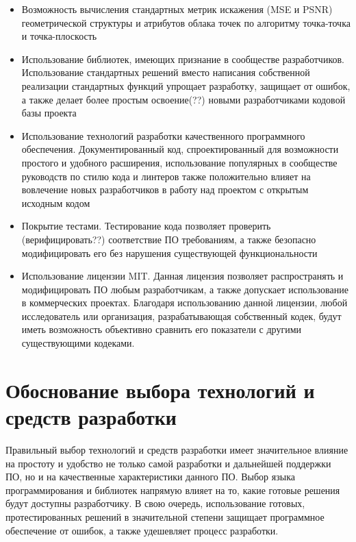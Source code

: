 \begin{itemize}
    \item Возможность вычисления стандартных метрик искажения (MSE и PSNR)
    геометрической структуры и атрибутов облака точек по алгоритму точка-точка и
    точка-плоскость
    \item Использование библиотек, имеющих признание в сообществе разработчиков.
    Использование стандартных решений вместо написания собственной реализации
    стандартных функций упрощает разработку, защищает от ошибок, а также делает
    более простым освоение(??) новыми разработчиками кодовой базы проекта
    \item Использование технологий разработки качественного программного
    обеспечения. Документированный код, спроектированный для возможности
    простого и удобного расширения, использование популярных в сообществе
    руководств по стилю кода и линтеров также положительно влияет на вовлечение
    новых разработчиков в работу над проектом с открытым исходным кодом
    \item Покрытие тестами. Тестирование кода позволяет проверить
    (верифицировать??) соответствие ПО требованиям, а также безопасно
    модифицировать его без нарушения существующей функциональности
    \item Использование лицензии MIT. Данная лицензия позволяет распространять и
    модифицировать ПО любым разработчикам, а также допускает использование в
    коммерческих проектах. Благодаря использованию данной лицензии, любой
    исследователь или организация, разрабатывающая собственный кодек, будут
    иметь возможность объективно сравнить его показатели с другими существующими
    кодеками.
\end{itemize}

\chapter{Обоснование выбора технологий и средств разработки}

Правильный выбор технологий и средств разработки имеет значительное влияние на
простоту и удобство не только самой разработки и дальнейшей поддержки ПО, но и
на качественные характеристики данного ПО. Выбор языка программирования и
библиотек напрямую влияет на то, какие готовые решения будут доступны
разработчику. В свою очередь, использование готовых, протестированных решений в
значительной степени защищает программное обеспечение от ошибок, а также
удешевляет процесс разработки.

